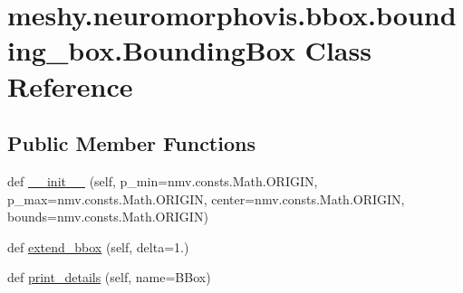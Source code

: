 \hypertarget{classmeshy_1_1neuromorphovis_1_1bbox_1_1bounding__box_1_1BoundingBox}{}\section{meshy.\+neuromorphovis.\+bbox.\+bounding\+\_\+box.\+Bounding\+Box Class Reference}
\label{classmeshy_1_1neuromorphovis_1_1bbox_1_1bounding__box_1_1BoundingBox}


 


\subsection*{Public Member Functions}
\begin{DoxyCompactItemize}
\item 
def \hyperlink{classmeshy_1_1neuromorphovis_1_1bbox_1_1bounding__box_1_1BoundingBox_aa63a3a459455032a2775a37b43057e6a}{\+\_\+\+\_\+init\+\_\+\+\_\+} (self, p\+\_\+min=nmv.\+consts.\+Math.\+O\+R\+I\+G\+IN, p\+\_\+max=nmv.\+consts.\+Math.\+O\+R\+I\+G\+IN, center=nmv.\+consts.\+Math.\+O\+R\+I\+G\+IN, bounds=nmv.\+consts.\+Math.\+O\+R\+I\+G\+IN)
\item 
def \hyperlink{classmeshy_1_1neuromorphovis_1_1bbox_1_1bounding__box_1_1BoundingBox_ad943f211e795560d82f4922971ab9911}{extend\+\_\+bbox} (self, delta=1.)
\item 
def \hyperlink{classmeshy_1_1neuromorphovis_1_1bbox_1_1bounding__box_1_1BoundingBox_a334c18c04ea1fd6f356efe9ae9d554b2}{print\+\_\+details} (self, name=\textquotesingle{}B\+Box\textquotesingle{})
\end{DoxyCompactItemize}
